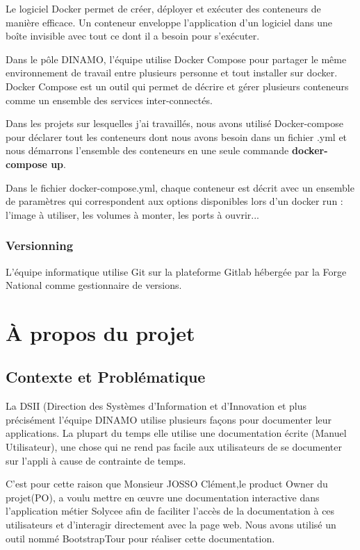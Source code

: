 \documentclass[12pt]{article}
\begin{document}
Le logiciel Docker permet de créer, déployer et exécuter des conteneurs de manière efficace. Un conteneur enveloppe l’application d’un logiciel dans une boîte invisible avec tout ce dont il a besoin pour s’exécuter.


Dans le pôle DINAMO, l'équipe utilise Docker Compose pour partager le même environnement de travail entre plusieurs personne et tout installer sur docker. Docker Compose est un outil qui permet de décrire et gérer  plusieurs conteneurs comme un ensemble des services inter-connectés.

Dans les projets sur lesquelles j'ai travaillés, nous avons utilisé Docker-compose pour déclarer tout les conteneurs dont nous avons besoin dans un fichier .yml  et nous démarrons l'ensemble des conteneurs en une seule commande \textbf{docker-compose up}. 

Dans le fichier docker-compose.yml, chaque conteneur est décrit avec un ensemble de paramètres qui correspondent aux options disponibles lors d’un docker run : l’image à utiliser, les volumes à monter, les ports à ouvrir...
 

\subsubsection{Versionning}

L'équipe informatique utilise Git sur la plateforme Gitlab hébergée par la Forge National comme gestionnaire de versions. 

\section{À propos du projet}

\subsection{Contexte et Problématique}

La DSII (Direction des Systèmes d'Information et d'Innovation et plus précisément l'équipe DINAMO utilise plusieurs façons pour documenter leur applications. La plupart du temps elle utilise une documentation écrite (Manuel Utilisateur), une chose qui ne rend pas facile aux utilisateurs de se documenter sur l'appli à cause de contrainte de temps. 


C'est pour cette raison que Monsieur JOSSO Clément,le product Owner du projet(PO), a voulu mettre en œuvre une documentation interactive dans l'application métier Solycee afin de faciliter l’accès de la documentation à ces utilisateurs et d'interagir directement avec la page web. Nous avons utilisé un outil nommé BootstrapTour pour réaliser cette documentation. 
\end{document}
